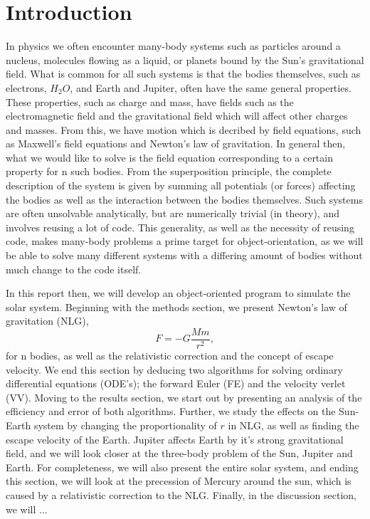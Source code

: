 \section{Introduction}
\label{sec:introduction}

In physics we often encounter many-body systems such as particles around a nucleus,
molecules flowing as a liquid, or planets bound by the Sun's gravitational field.
What is common for all such systems is that the bodies themselves, such as
electrons, $H_2 O$, and Earth and Jupiter, often have the same general properties.
These properties, such as charge and mass, have fields such as the electromagnetic field
and the gravitational field which will affect other charges and masses. From this,
we have motion which is decribed by field equations, such as Maxwell's field equations
and Newton's law of gravitation. In general then, what we would like to solve is
the field equation corresponding to a certain property for n such bodies. From
the superposition principle, the complete description of the system is given by
summing all potentials (or forces) affecting the bodies as well as the interaction
between the bodies themselves. Such systems are often unsolvable analytically, but are
numerically trivial (in theory), and involves reusing a lot of code. This generality,
as well as the necessity of reusing code, makes many-body problems a prime target
for object-orientation, as we will be able to solve many different systems with
a differing amount of bodies without much change to the code itself.

In this report then, we will develop an object-oriented program to simulate the
solar system. Beginning with the methods section, we present Newton's law of gravitation (NLG),
  \begin{equation}
  F = -G\frac{Mm}{r^2},
  \end{equation}
for n bodies, as well as the relativistic correction and the concept of escape velocity.
We end this section by deducing two algorithms for solving ordinary differential equations (ODE's);
the forward Euler (FE) and the velocity verlet (VV). Moving to the results section, we start out
by presenting an analysis of the efficiency and error of both algorithms. Further,
we study the effects on the Sun-Earth system by changing the proportionality of $r$ in NLG,
as well as finding the escape velocity of the Earth. Jupiter affects Earth by it's strong gravitational field,
and we will look closer at the three-body problem of the Sun, Jupiter and Earth. For completeness,
we will also present the entire solar system, and ending this section, we will
look at the precession of Mercury around the sun, which is caused by a relativistic correction
to the NLG. Finally, in the discussion section, we will ...
